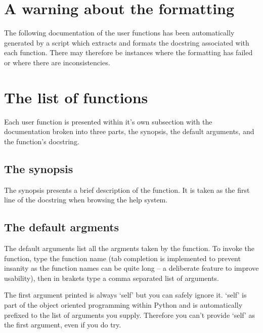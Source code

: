 \documentclass[a4paper, 11pt, twoside]{book}
\begin{document}

\section{A warning about the formatting}

The following documentation of the user functions has been automatically generated by a script which extracts and formats the docstring associated with each function.  There may therefore be instances where the formatting has failed or where there are inconsistencies.



\section{The list of functions}

Each user function is presented within it's own subsection with the documentation broken into three parts, the synopsis, the default arguments, and the function's docstring.


\subsection{The synopsis}

The synopsis presents a brief description of the function.  It is taken as the first line of the docstring when browsing the help system.


\subsection{The default argments}

The default arguments list all the argments taken by the function.  To invoke the function, type the function name (tab completion is implemented to prevent insanity as the function names can be quite long -- a deliberate feature to improve usability), then in brakets type a comma separated list of arguments.

The first argument printed is always `self' but you can safely ignore it.  `self' is part of the object oriented programming within Python and is automatically prefixed to the list of arguments you supply.  Therefore you can't provide `self' as the first argument, even if you do try.
\end{document}
